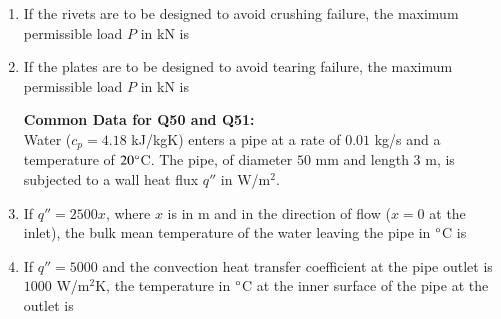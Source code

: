 \documentclass[journal]{IEEEtran}
\begin{document}
\begin{enumerate}[leftmargin=0pt]
\item 




If the rivets are to be designed to avoid crushing failure, the maximum permissible load $P$ in kN is
\begin{enumerate}
\end{enumerate}
\hfill{}

\item If the plates are to be designed to avoid tearing failure, the maximum permissible load $P$ in kN is
\begin{enumerate}
\end{enumerate}
\hfill{}

\textbf{Common Data for Q50 and Q51:}  \\
Water ($c_p = 4.18$ kJ/kgK) enters a pipe at a rate of $0.01$ kg/s and a temperature of $20\degree$C. The pipe, of diameter $50$ mm and length $3$ m, is subjected to a wall heat flux $q''$ in W/m$^2$.\\
\item


If $q'' = 2500x$, where $x$ is in m and in the direction of flow ($x=0$ at the inlet), the bulk mean temperature of the water leaving the pipe in $\degree$C is
\begin{enumerate}
\end{enumerate}
\hfill{}

\item If $q'' = 5000$ and the convection heat transfer coefficient at the pipe outlet is $1000$ W/m$^2$K, the temperature in $\degree$C at the inner surface of the pipe at the outlet is
\begin{enumerate}
\end{enumerate}
\hfill{}


\end{enumerate}
\end{document}
